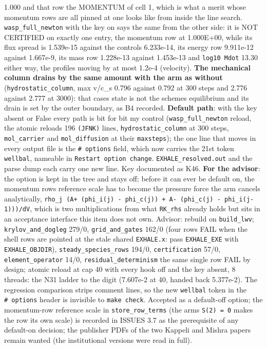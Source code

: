 \documentclass[english,a4paper]{my_memo}
\begin{document}
\begin{itemize}
  1.000 and that row the MOMENTUM of cell 1, which is what a merit whose
  momentum rows are all pinned at one looks like from inside the line
  search. \texttt{wasp\_full\_newton} with the key on says the same from the other
  side: it is NOT CERTIFIED on exactly one entry, the momentum row at
  1.000E+00, while its flux spread is 1.539e-15 against the control\textquotesingle s
  6.233e-14, its energy row 9.911e-12 against 1.667e-9, its mass row
  1.228e-13 against 1.453e-13 and \texttt{log10\ Mdot} 13.30 either way, the
  profiles moving by at most 1.2e-4 (velocity). \textbf{The
  mechanical column drains by the same amount with the arm as without}
  (\texttt{hydrostatic\_column}, max \textbar v\textbar/c\_s 0.796 against 0.792 at 300 steps and
  2.776 against 2.777 at 3000): that case\textquotesingle s state is not the scheme\textquotesingle s
  equilibrium and its drain is set by the outer boundary, as B4 recorded.
  \textbf{Default path}: with the key absent or False every path is bit for bit
  my control (\texttt{wasp\_full\_newton} reload, the atomic reload\textquotesingle s 196 \texttt{(JFNK)}
  lines, \texttt{hydrostatic\_column} at 300 steps, \texttt{mol\_carrier} and
  \texttt{mol\_diffusion} at their \texttt{maxsteps}); the one line that moves in every
  output file is the \texttt{\#\ options} field, which now carries the 21st token
  \texttt{wellbal}, nameable in \texttt{Restart\ option\ change}. \texttt{EXHALE\_resolved.out} and
  the parse dump each carry one new line. Key documented as K46. \textbf{For the
  advisor}: the option is kept in the tree and stays off; before it can
  ever be default on, the momentum row\textquotesingle s reference scale has to become the
  pressure force the arm cancels analytically,
  \texttt{\textbar{}rho\_j\ (A+\ (phi\_i(j)\ -\ phi\_c(j))\ +\ A-\ (phi\_c(j)\ -\ phi\_i(j-1)))\textbar{}/dV},
  which is two multiplications from what \texttt{RK\_rhs} already holds but sits in
  an acceptance interface this item does not own. Advisor: rebuild on \texttt{build\_lwv}; \texttt{krylov\_and\_dogleg} 279/0, \texttt{grid\_and\_gates} 162/0 (four rows FAIL when the shell rows are pointed at the stale shared \texttt{EXHALE.x}: pass \texttt{EXHALE\_EXE} with \texttt{EXHALE\_OBJDIR}), \texttt{steady\_species\_rows} 194/0, \texttt{certification} 57/0, \texttt{element\_operator} 14/0, \texttt{residual\_determinism} the same single row FAIL by design; atomic reload at cap 40 with every hook off and the key absent, 8 threads: the N31 ladder to the digit (7.607e-2 at 40, handed back 5.377e-2). The regression comparison strips comment lines, so the new \texttt{wellbal} token in the \texttt{\#\ options} header is invisible to \texttt{make\ check}. Accepted as a default-off option; the momentum-row reference scale in \texttt{store\_row\_terms} (the arm\textquotesingle s \texttt{S(2)\ =\ 0} makes the row its own scale) is recorded in ISSUES 3.7 as the prerequisite of any default-on decision; the publisher PDFs of the two Kappeli and Mishra papers remain wanted (the institutional versions were read in full).

\end{itemize}
\end{document}
